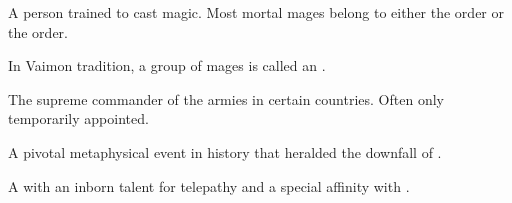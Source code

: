 \begin{gloss}
\begin{comment}
\paragraph{The Light}
\end{comment}
\seee{\iquin}







\begin{comment}
\paragraph{mage}
\end{comment}
A person trained to cast magic. 
Most mortal mages belong to either the  order or the  order. 

In Vaimon tradition, a group of mages is called an . 







\begin{comment}
\paragraph{Marshal}
\end{comment}
The supreme commander of the armies in certain \Velcadian{} countries. 
Often only temporarily appointed. 







\begin{comment}
\paragraph{Murder of the Dawn}
\end{comment}
A pivotal metaphysical event in \resphan{} history that heralded the downfall of \Merkyrah. 







\begin{comment}
\paragraph{\nycaneer}
\end{comment}
\gitem{\nycaneer}
\index{\nycaneer}
A  with an inborn talent for telepathy and a special affinity with . 








\end{gloss}
